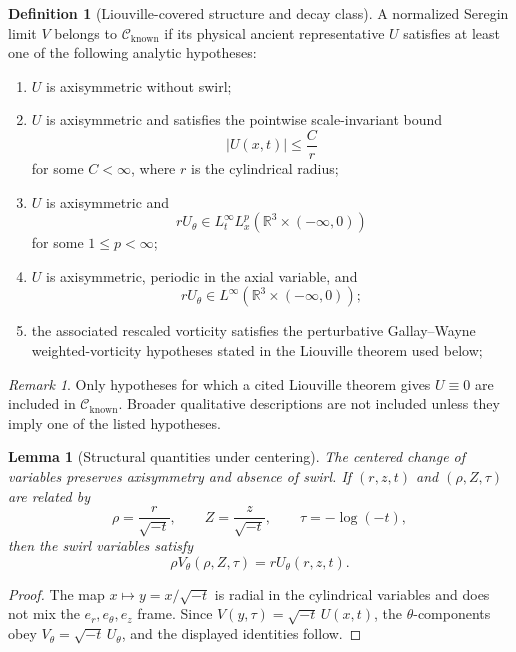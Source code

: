 \documentclass[11pt]{amsart}
\theoremstyle{plain}
\newtheorem{lemma}[theorem]{Lemma}
\theoremstyle{definition}
\newtheorem{definition}[theorem]{Definition}
\theoremstyle{remark}
\newtheorem{remark}[theorem]{Remark}
\numberwithin{equation}{section}
\newcommand{\R}{\mathbb R}
\newcommand{\calC}{\mathcal C}
\begin{document}
\begin{definition}[Liouville-covered structure and decay class]
\label{def:known-structure-decay-class}
A normalized Seregin limit \(V\) belongs to \(\calC_{\mathrm{known}}\) if its
physical ancient representative \(U\) satisfies at least one of the following
analytic hypotheses:
\begin{enumerate}[label=(\roman*)]
\item \(U\) is axisymmetric without swirl;
\item \(U\) is axisymmetric and satisfies the pointwise scale-invariant bound
\[
   |U(x,t)|\le \frac{C}{r}
\]
for some \(C<\infty\), where \(r\) is the cylindrical radius;
\item \(U\) is axisymmetric and
\[
   rU_\theta\in L_t^\infty L_x^p(\R^3\times(-\infty,0))
\]
for some \(1\le p<\infty\);
\item \(U\) is axisymmetric, periodic in the axial variable, and
\[
   rU_\theta\in L^\infty(\R^3\times(-\infty,0));
\]
\item the associated rescaled vorticity satisfies the perturbative
Gallay--Wayne weighted-vorticity hypotheses stated in the Liouville theorem
used below;
\end{enumerate}
\end{definition}

\begin{remark}
Only hypotheses for which a cited Liouville theorem gives \(U\equiv0\) are
included in \(\calC_{\mathrm{known}}\).  Broader qualitative descriptions are
not included unless they imply one of the listed hypotheses.
\end{remark}

\begin{lemma}[Structural quantities under centering]
\label{lem:structure-centering}
The centered change of variables preserves axisymmetry and absence of swirl.
If \((r,z,t)\) and \((\rho,Z,\tau)\) are related by
\[
   \rho=\frac r{\sqrt{-t}},\qquad Z=\frac z{\sqrt{-t}},
   \qquad \tau=-\log(-t),
\]
then the swirl variables satisfy
\[
   \rho V_\theta(\rho,Z,\tau)=rU_\theta(r,z,t).
\]
\end{lemma}

\begin{proof}
The map \(x\mapsto y=x/\sqrt{-t}\) is radial in the cylindrical variables and
does not mix the \(e_r,e_\theta,e_z\) frame.  Since
\(V(y,\tau)=\sqrt{-t}\,U(x,t)\), the \(\theta\)-components obey
\(V_\theta=\sqrt{-t}\,U_\theta\), and the displayed identities follow.
\end{proof}
\end{document}
